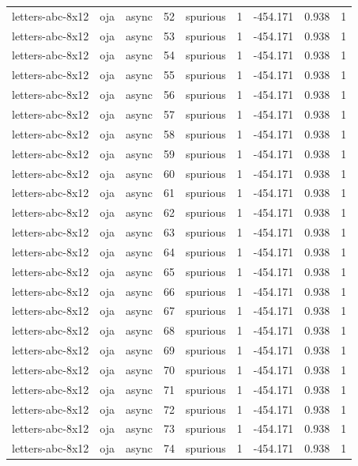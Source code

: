 \begin{tabular}{lllrlrrrr}
letters-abc-8x12 & oja & async & 52 & spurious & 1 & -454.171 & 0.938 & 1 \\
letters-abc-8x12 & oja & async & 53 & spurious & 1 & -454.171 & 0.938 & 1 \\
letters-abc-8x12 & oja & async & 54 & spurious & 1 & -454.171 & 0.938 & 1 \\
letters-abc-8x12 & oja & async & 55 & spurious & 1 & -454.171 & 0.938 & 1 \\
letters-abc-8x12 & oja & async & 56 & spurious & 1 & -454.171 & 0.938 & 1 \\
letters-abc-8x12 & oja & async & 57 & spurious & 1 & -454.171 & 0.938 & 1 \\
letters-abc-8x12 & oja & async & 58 & spurious & 1 & -454.171 & 0.938 & 1 \\
letters-abc-8x12 & oja & async & 59 & spurious & 1 & -454.171 & 0.938 & 1 \\
letters-abc-8x12 & oja & async & 60 & spurious & 1 & -454.171 & 0.938 & 1 \\
letters-abc-8x12 & oja & async & 61 & spurious & 1 & -454.171 & 0.938 & 1 \\
letters-abc-8x12 & oja & async & 62 & spurious & 1 & -454.171 & 0.938 & 1 \\
letters-abc-8x12 & oja & async & 63 & spurious & 1 & -454.171 & 0.938 & 1 \\
letters-abc-8x12 & oja & async & 64 & spurious & 1 & -454.171 & 0.938 & 1 \\
letters-abc-8x12 & oja & async & 65 & spurious & 1 & -454.171 & 0.938 & 1 \\
letters-abc-8x12 & oja & async & 66 & spurious & 1 & -454.171 & 0.938 & 1 \\
letters-abc-8x12 & oja & async & 67 & spurious & 1 & -454.171 & 0.938 & 1 \\
letters-abc-8x12 & oja & async & 68 & spurious & 1 & -454.171 & 0.938 & 1 \\
letters-abc-8x12 & oja & async & 69 & spurious & 1 & -454.171 & 0.938 & 1 \\
letters-abc-8x12 & oja & async & 70 & spurious & 1 & -454.171 & 0.938 & 1 \\
letters-abc-8x12 & oja & async & 71 & spurious & 1 & -454.171 & 0.938 & 1 \\
letters-abc-8x12 & oja & async & 72 & spurious & 1 & -454.171 & 0.938 & 1 \\
letters-abc-8x12 & oja & async & 73 & spurious & 1 & -454.171 & 0.938 & 1 \\
letters-abc-8x12 & oja & async & 74 & spurious & 1 & -454.171 & 0.938 & 1 \\

\end{tabular}
